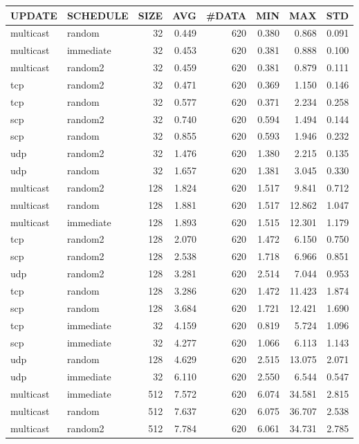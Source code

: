 \begin{tabular}{|l|l|r|r|r|r|r|r|}
\hline
UPDATE & SCHEDULE & SIZE & AVG & \#DATA & MIN & MAX & STD\\
\hline
multicast & random & 32 &  0.449 & 620 & 0.380 & 0.868 & 0.091\\
multicast & immediate & 32 &  0.453 & 620 & 0.381 & 0.888 & 0.100\\
multicast & random2 & 32 &  0.459 & 620 & 0.381 & 0.879 & 0.111\\
tcp & random2 & 32 &  0.471 & 620 & 0.369 & 1.150 & 0.146\\
tcp & random & 32 &  0.577 & 620 & 0.371 & 2.234 & 0.258\\
scp & random2 & 32 &  0.740 & 620 & 0.594 & 1.494 & 0.144\\
scp & random & 32 &  0.855 & 620 & 0.593 & 1.946 & 0.232\\
udp & random2 & 32 &  1.476 & 620 & 1.380 & 2.215 & 0.135\\
udp & random & 32 &  1.657 & 620 & 1.381 & 3.045 & 0.330\\
multicast & random2 & 128 &  1.824 & 620 & 1.517 & 9.841 & 0.712\\
multicast & random & 128 &  1.881 & 620 & 1.517 & 12.862 & 1.047\\
multicast & immediate & 128 &  1.893 & 620 & 1.515 & 12.301 & 1.179\\
tcp & random2 & 128 &  2.070 & 620 & 1.472 & 6.150 & 0.750\\
scp & random2 & 128 &  2.538 & 620 & 1.718 & 6.966 & 0.851\\
udp & random2 & 128 &  3.281 & 620 & 2.514 & 7.044 & 0.953\\
tcp & random & 128 &  3.286 & 620 & 1.472 & 11.423 & 1.874\\
scp & random & 128 &  3.684 & 620 & 1.721 & 12.421 & 1.690\\
tcp & immediate & 32 &  4.159 & 620 & 0.819 & 5.724 & 1.096\\
scp & immediate & 32 &  4.277 & 620 & 1.066 & 6.113 & 1.143\\
udp & random & 128 &  4.629 & 620 & 2.515 & 13.075 & 2.071\\
udp & immediate & 32 &  6.110 & 620 & 2.550 & 6.544 & 0.547\\
multicast & immediate & 512 &  7.572 & 620 & 6.074 & 34.581 & 2.815\\
multicast & random & 512 &  7.637 & 620 & 6.075 & 36.707 & 2.538\\
multicast & random2 & 512 &  7.784 & 620 & 6.061 & 34.731 & 2.785\\

\end{tabular}
